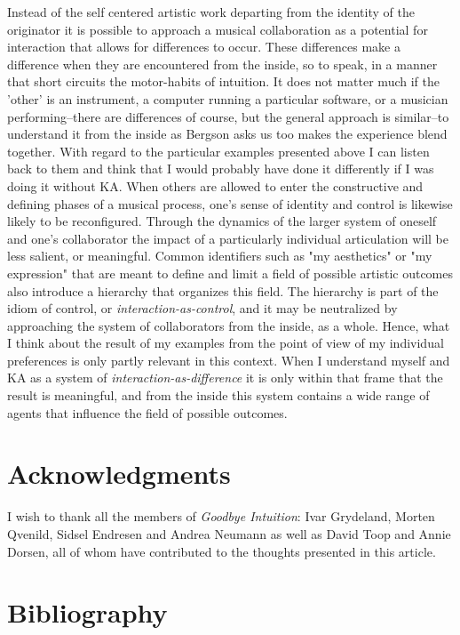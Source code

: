 \documentclass[11pt]{article}
\begin{document}
Instead of the self centered artistic work departing from the identity of the originator it is possible to approach a musical collaboration as a potential for interaction that allows for differences to occur. These differences make a difference when they are encountered from the inside, so to speak, in a manner that short circuits the motor-habits of intuition. It does not matter much if the 'other' is an instrument, a computer running a particular software, or a musician performing--there are differences of course, but the general approach is similar--to understand it from the inside as Bergson asks us too makes the experience blend together. With regard to the particular examples presented above I can listen back to them and think that I would probably have done it differently if I was doing it without KA. When others are allowed to enter the constructive and defining phases of a musical process, one's sense of identity and control is likewise likely to be reconfigured. Through the dynamics of the larger system of oneself and one's collaborator the impact of a particularly individual articulation will be less salient, or meaningful. Common identifiers such as "my aesthetics" or "my expression" that are meant to define and limit a field of possible artistic outcomes also introduce a hierarchy that organizes this field. The hierarchy is part of the idiom of control, or \emph{interaction-as-control}, and it may be neutralized by approaching the system of collaborators from the inside, as a whole. Hence, what I think about the result of my examples from the point of view of my individual preferences is only partly relevant in this context. When I understand myself and KA as a system of \emph{interaction-as-difference} it is only within that frame that the result is meaningful, and from the inside this system contains a wide range of agents that influence the field of possible outcomes.

\section*{Acknowledgments}
\label{sec:orgd666ffc}
   I wish to thank all the members of \emph{Goodbye Intuition}: Ivar Grydeland,
Morten Qvenild, Sidsel Endresen and Andrea Neumann as well as David
Toop and Annie Dorsen, all of whom have contributed to the thoughts
presented in this article.

\section*{Bibliography}
\label{sec:org4513767}
\printbibliography
\end{document}
